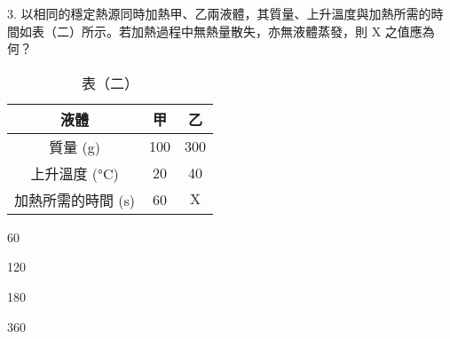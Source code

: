 \documentclass[12pt]{article}
\begin{document}
\begin{problem}
  \item[3.] 以相同的穩定熱源同時加熱甲、乙兩液體，其質量、上升溫度與加熱所需的時間如表（二）所示。若加熱過程中無熱量散失，亦無液體蒸發，則 $\mathrm{X}$ 之值應為何？
  \begin{table}[ht]
    \centering
    \renewcommand{\arraystretch}{1.2}
    \vspace*{-1ex}
    \caption*{表（二）}
    \vspace*{-1ex}
    \begin{tabular}{|c|c|c|}
      \hline
      液體 & 甲 & 乙 \\ \hline
      質量 (\unit{\gram}) & 100 & 300 \\ \hline
      上升溫度 (\unit{\degreeCelsius}) & 20 & 40 \\ \hline
      加熱所需的時間 (\unit{\second}) & 60 & $\mathrm{X}$ \\ \hline
    \end{tabular}
    \vspace*{-2ex}
  \end{table}
  \begin{choices}
    \item 60
    \item 120
    \item 180
    \item 360
  \end{choices}
\end{problem}
\end{document}

